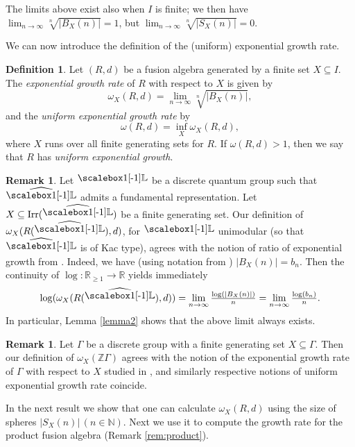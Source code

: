 \documentclass[11 pt, leqno]{amsart}
\newcommand{\bbGamma}{{\mathpalette\makebbGamma\relax}}
\newcommand{\makebbGamma}[2]{%
  \raisebox{\depth}{\scalebox{1}[-1]{$\mathsurround=0pt#1\mathbb{L}$}}%
}
\newcommand{\NN}{\mathbb{N}}
\newcommand{\RR}{\mathbb{R}}
\newcommand{\ZZ}{\mathbb{Z}}
\newcommand{\wh}{\widehat}
\DeclareMathOperator{\Irr}{Irr}
\theoremstyle{definition}
\newtheorem{remark}[theorem]{Remark}
\newtheorem{definition}[theorem]{Definition}
\numberwithin{equation}{section}
\begin{document}
The limits above exist also when $I$ is finite; we then have $ \lim_{n\to\infty} \sqrt[n]{|B_X(n)|}=1$, but $ \lim_{n\to\infty} \sqrt[n]{|S_X(n)|}=0$.


We can now introduce the definition of the (uniform) exponential growth rate.

\begin{definition}
	Let $(R,d)$ be a fusion algebra generated by a finite set $X\subseteq I$. The \emph{exponential growth rate} of $R$ with respect to $X$ is given by
	\[
	\omega_X(R,d)=\lim_{n\to\infty} \sqrt[n]{|B_X(n)|},
	\]
	and the \emph{uniform exponential growth rate} by
\[
\omega(R,d)=\inf_X \omega_X(R,d),
\]
	where $X$ runs over all finite generating sets for $R$. If $\omega(R,d)>1$, then we say that $R$ has \emph{uniform exponential growth}.
\end{definition}




\begin{remark}\label{rem:BV}
		Let $\bbGamma$ be a discrete quantum group such that $\wh{\bbGamma}$ admits a fundamental representation. %
		 Let $X\subseteq \Irr(\wh{\bbGamma })$ be a finite generating set. Our definition of $\omega_X(R(\wh \bbGamma),d)$, for $\bbGamma$ unimodular (so that $\wh  \bbGamma$ is of Kac type), agrees with the notion of ratio of exponential growth from \cite[Section 4]{BanicaVergnioux}. Indeed, we have (using notation from \cite{BanicaVergnioux}) $|B_X(n)|=b_n$. Then the continuity of $\log\colon \RR_{\ge 1}\rightarrow \RR$ yields immediately
		\[
		\log(\omega_X(R(\wh \bbGamma),d))=\lim_{n\to\infty} \tfrac{\log(|B_X(n)|)}{n}=\lim_{n\to\infty} \tfrac{\log(b_n)}{n}.
		\]
		In particular, Lemma \ref{lemma2} shows that the above limit always exists.
\end{remark}

\begin{remark}\label{rem:Aetal}
	 Let $\Gamma$ be a discrete group with a finite generating set $X\subseteq \Gamma$. Then our definition of $\omega_X(\ZZ\Gamma)$ agrees with the notion of the exponential growth rate of $\Gamma$ with respect to $X$ studied in \cite{Arzhantseva}, and similarly respective notions of uniform exponential growth rate coincide.
\end{remark}

In the next result we show that one can calculate $\omega_X(R,d)$ using the size of spheres $|S_X(n)|\,(n\in\NN)$. Next we use it to compute the growth rate for the product fusion algebra (Remark \ref{rem:product}). 
\end{document}
